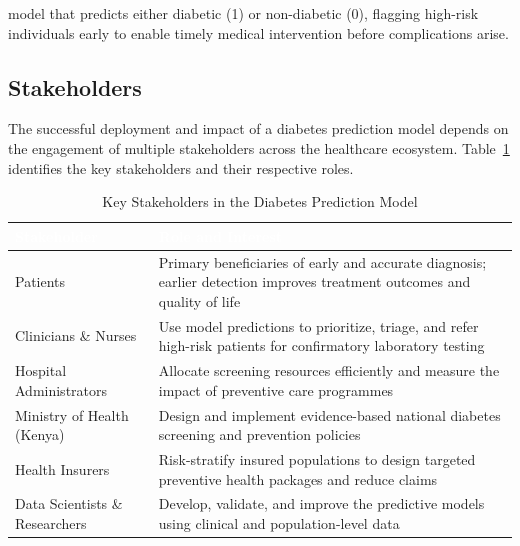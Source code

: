 \documentclass[12pt]{article}
\begin{document}
model that predicts either diabetic (1) or non-diabetic (0), flagging high-risk individuals early to enable timely medical intervention before complications arise.

\subsection{Stakeholders}
The successful deployment and impact of a diabetes prediction model depends on the engagement of multiple stakeholders across the healthcare ecosystem. Table~\ref{tab:stakeholders} identifies the key stakeholders and their respective roles.

\begin{table}[H]
\centering
\caption{Key Stakeholders in the Diabetes Prediction Model}
\label{tab:stakeholders}
\begin{tabular}{|p{4.5cm}|p{9cm}|}
\hline
\rowcolor{tableheader}
\textcolor{white}{\textbf{Stakeholder}} &
\textcolor{white}{\textbf{Role and Interest}} \\ \hline
\rowcolor{tablerowlight}
Patients &
Primary beneficiaries of early and accurate diagnosis; earlier
detection improves treatment outcomes and quality of life \\ \hline
\rowcolor{tablerowwhite}
Clinicians \& Nurses &
Use model predictions to prioritize, triage, and refer
high-risk patients for confirmatory laboratory testing \\ \hline
\rowcolor{tablerowlight}
Hospital Administrators &
Allocate screening resources efficiently and measure
the impact of preventive care programmes \\ \hline
\rowcolor{tablerowwhite}
Ministry of Health (Kenya) &
Design and implement evidence-based national diabetes
screening and prevention policies \\ \hline
\rowcolor{tablerowlight}
Health Insurers &
Risk-stratify insured populations to design targeted
preventive health packages and reduce claims \\ \hline
\rowcolor{tablerowwhite}
Data Scientists \& Researchers &
Develop, validate, and improve the predictive models
using clinical and population-level data \\ \hline
\end{tabular}
\end{table}
\end{document}
